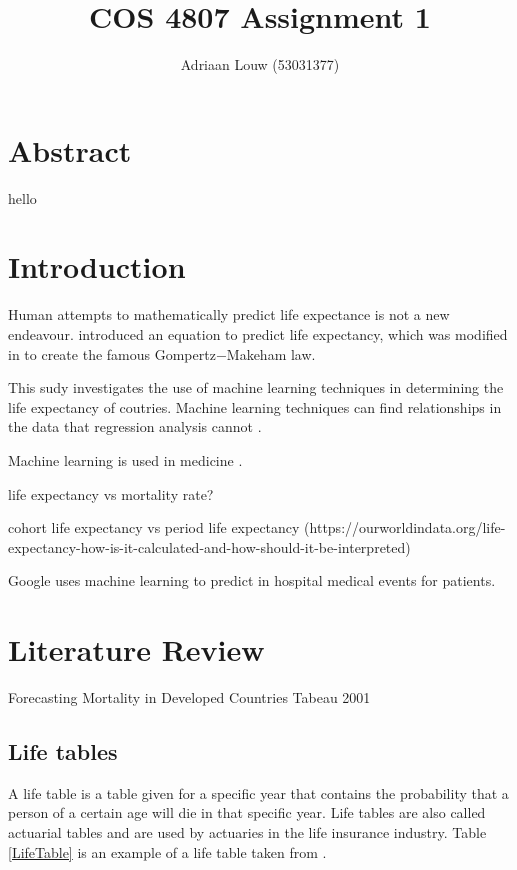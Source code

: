 \documentclass[12pt,a4paper]{article}
\title{COS 4807 Assignment 1}
\author{Adriaan Louw (53031377)}
\begin{document}
\maketitle

\tableofcontents

\listoffigures

\listoftables


\section{Abstract}
hello
\section{Introduction}

Human attempts to mathematically predict life expectance is not a new endeavour. \cite{Gompertz} introduced an equation to predict life expectancy, which was modified in \cite{Makeham1860} to create the famous Gompertz$-$Makeham law.

This sudy investigates the use of machine learning techniques in determining the life expectancy of coutries. Machine learning techniques can find relationships in the data that regression analysis cannot \cite{Chen2017}.

Machine learning is used in medicine \cite{Chen2017}.

life expectancy vs mortality rate?

cohort life expectancy vs period life expectancy (https://ourworldindata.org/life-expectancy-how-is-it-calculated-and-how-should-it-be-interpreted)

\cite{Rajkomar2018} Google uses machine learning to predict in hospital medical events for patients. 

\section{Literature Review}

Forecasting Mortality in Developed Countries Tabeau 2001

\subsection{Life tables}

A life table is a table given for a specific year that contains the probability that a person of a certain age will die in that specific year. Life tables are also called actuarial tables and are used by actuaries in the life insurance industry. Table \ref{LifeTable} is an example of a life table taken from \cite{Arias2007}.
\end{document}
